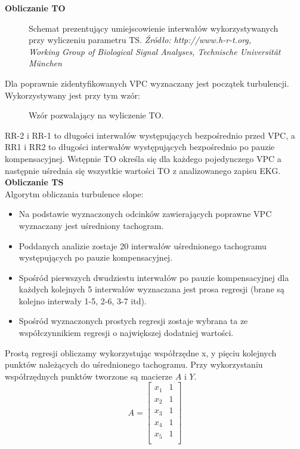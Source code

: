 \documentclass[a4paper, 11pt]{article}
\begin{document}
\textbf{Obliczanie TO}\\
\begin{figure}[h!]
\centering
\caption{Schemat prezentujący umiejscowienie interwałów wykorzystywanych przy wyliczeniu parametru TS. 
\textit{ Źródło: http://www.h-r-t.org, Working Group of Biological Signal Analyses, Technische Universität München} }
\end{figure}
Dla poprawnie zidentyfikowanych VPC wyznaczany jest początek turbulencji.
Wykorzystywany jest przy tym wzór:
\begin{figure}[h!]
\centering
\caption{Wzór pozwalający na wyliczenie TO. }
\end{figure}
\noindent RR-2 i RR-1 to długości interwałów występujących bezpośrednio przed VPC,
a RR1 i RR2 to długości interwałów występujących bezpośrednio po pauzie 
kompensacyjnej.
Wstępnie TO określa się dla każdego pojedynczego VPC a następnie uśrednia się wszystkie wartości TO z analizowanego zapisu EKG.
\textbf{Obliczanie TS}\\
Algorytm obliczania turbulence slope:
\begin{itemize}
\item Na podstawie wyznaczonych odcinków zawierających poprawne VPC wyznaczany jest 
uśredniony tachogram.
\item Poddanych analizie zostaje 20 interwałów uśrednionego tachogramu występujących po pauzie kompensacyjnej. 
\item Spośród pierwszych dwudziestu interwałów po pauzie kompensacyjnej dla każdych kolejnych 5 interwałów wyznaczana
jest prosa regresji (brane są kolejno interwały 1-5, 2-6, 3-7 itd).
\item Spośród wyznaczonych prostych regresji zostaje wybrana ta ze współczynnikiem regresji 
o największej dodatniej wartości. 
\end{itemize}
Prostą regresji obliczamy wykorzystując współrzędne x, y pięciu kolejnych punktów należących
do uśrednionego tachogramu. Przy wykorzystaniu współrzędnych punktów tworzone są macierze
$A$ i $Y$.
\begin{equation}
A =  \left[
 \begin{array}{ccc}
   x_{1} & 1 \\
   x_{2} & 1 \\
   x_{3} & 1 \\ 
   x_{4} & 1 \\
   x_{5} & 1 \\ 
 \end{array}
\right]
\end{equation}
\end{document}
